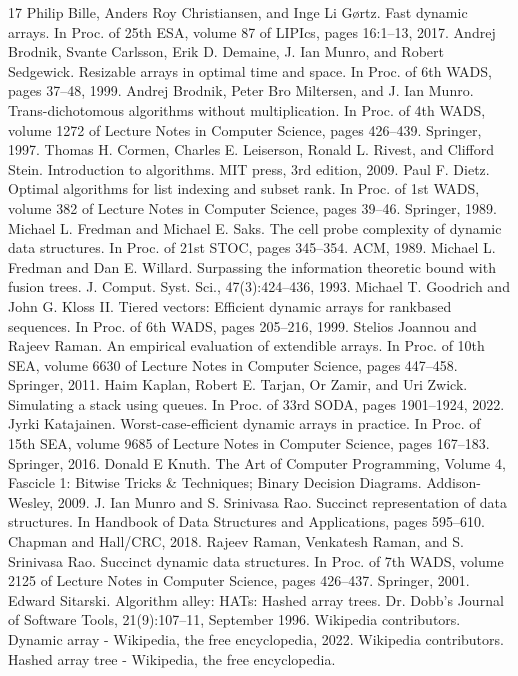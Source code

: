 \documentclass[11pt,a4paper]{article}
\begin{document}
\begin{thebibliography}{17}
 Philip Bille, Anders Roy Christiansen, and Inge Li Gørtz. Fast dynamic arrays. In Proc. of 25th ESA, volume 87 of LIPIcs, pages 16:1–13, 2017.
 Andrej Brodnik, Svante Carlsson, Erik D. Demaine, J. Ian Munro, and Robert Sedgewick. Resizable arrays in optimal time and space. In Proc. of 6th WADS, pages 37–48, 1999.
 Andrej Brodnik, Peter Bro Miltersen, and J. Ian Munro. Trans-dichotomous algorithms without multiplication. In Proc. of 4th WADS, volume 1272 of Lecture Notes in Computer Science, pages 426–439. Springer, 1997.
 Thomas H. Cormen, Charles E. Leiserson, Ronald L. Rivest, and Clifford Stein. Introduction to algorithms. MIT press, 3rd edition, 2009.
 Paul F. Dietz. Optimal algorithms for list indexing and subset rank. In Proc. of 1st WADS, volume 382 of Lecture Notes in Computer Science, pages 39–46. Springer, 1989.
 Michael L. Fredman and Michael E. Saks. The cell probe complexity of dynamic data structures. In Proc. of 21st STOC, pages 345–354. ACM, 1989.
 Michael L. Fredman and Dan E. Willard. Surpassing the information theoretic bound with fusion trees. J. Comput. Syst. Sci., 47(3):424–436, 1993.
 Michael T. Goodrich and John G. Kloss II. Tiered vectors: Efficient dynamic arrays for rankbased sequences. In Proc. of 6th WADS, pages 205–216, 1999.
 Stelios Joannou and Rajeev Raman. An empirical evaluation of extendible arrays. In Proc. of 10th SEA, volume 6630 of Lecture Notes in Computer Science, pages 447–458. Springer, 2011.
 Haim Kaplan, Robert E. Tarjan, Or Zamir, and Uri Zwick. Simulating a stack using queues. In Proc. of 33rd SODA, pages 1901–1924, 2022.
 Jyrki Katajainen. Worst-case-efficient dynamic arrays in practice. In Proc. of 15th SEA, volume 9685 of Lecture Notes in Computer Science, pages 167–183. Springer, 2016.
 Donald E Knuth. The Art of Computer Programming, Volume 4, Fascicle 1: Bitwise Tricks \& Techniques; Binary Decision Diagrams. Addison-Wesley, 2009.
 J. Ian Munro and S. Srinivasa Rao. Succinct representation of data structures. In Handbook of Data Structures and Applications, pages 595–610. Chapman and Hall/CRC, 2018.
 Rajeev Raman, Venkatesh Raman, and S. Srinivasa Rao. Succinct dynamic data structures. In Proc. of 7th WADS, volume 2125 of Lecture Notes in Computer Science, pages 426–437. Springer, 2001.
 Edward Sitarski. Algorithm alley: HATs: Hashed array trees. Dr. Dobb’s Journal of Software Tools, 21(9):107–11, September 1996.
 Wikipedia contributors. Dynamic array - Wikipedia, the free encyclopedia, 2022.
 Wikipedia contributors. Hashed array tree - Wikipedia, the free encyclopedia.
\end{thebibliography}
\end{document}
